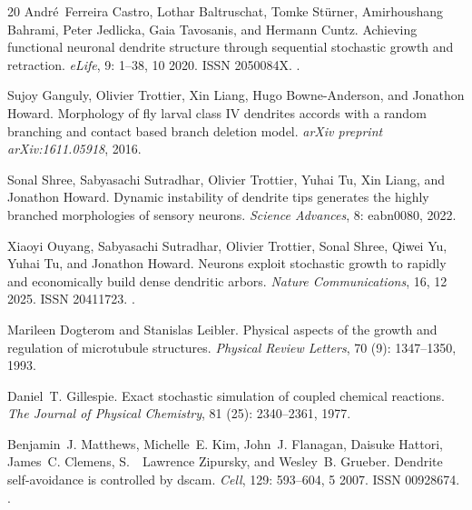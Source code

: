 \documentclass[11pt,a4paper]{article}
\begin{document}
\begin{thebibliography}{20}
André~Ferreira Castro, Lothar Baltruschat, Tomke Stürner, Amirhoushang
  Bahrami, Peter Jedlicka, Gaia Tavosanis, and Hermann Cuntz.
\newblock Achieving functional neuronal dendrite structure through sequential
  stochastic growth and retraction.
\newblock \emph{eLife}, 9: 1--38, 10 2020.
\newblock ISSN 2050084X.
\newblock {}.

Sujoy Ganguly, Olivier Trottier, Xin Liang, Hugo Bowne-Anderson, and Jonathon
  Howard.
\newblock Morphology of fly larval class {IV} dendrites accords with a random
  branching and contact based branch deletion model.
\newblock \emph{arXiv preprint arXiv:1611.05918}, 2016.

Sonal Shree, Sabyasachi Sutradhar, Olivier Trottier, Yuhai Tu, Xin Liang, and
  Jonathon Howard.
\newblock Dynamic instability of dendrite tips generates the highly branched
  morphologies of sensory neurons.
\newblock \emph{Science Advances}, 8: eabn0080, 2022.

Xiaoyi Ouyang, Sabyasachi Sutradhar, Olivier Trottier, Sonal Shree, Qiwei Yu,
  Yuhai Tu, and Jonathon Howard.
\newblock Neurons exploit stochastic growth to rapidly and economically build
  dense dendritic arbors.
\newblock \emph{Nature Communications}, 16, 12 2025.
\newblock ISSN 20411723.
\newblock {}.

Marileen Dogterom and Stanislas Leibler.
\newblock Physical aspects of the growth and regulation of microtubule
  structures.
\newblock \emph{Physical Review Letters}, 70 (9): 1347--1350,
  1993.

Daniel~T. Gillespie.
\newblock Exact stochastic simulation of coupled chemical reactions.
\newblock \emph{The Journal of Physical Chemistry}, 81 (25):
  2340--2361, 1977.

Benjamin~J. Matthews, Michelle~E. Kim, John~J. Flanagan, Daisuke Hattori,
  James~C. Clemens, S.~ Lawrence Zipursky, and Wesley~B. Grueber.
\newblock Dendrite self-avoidance is controlled by dscam.
\newblock \emph{Cell}, 129: 593--604, 5 2007.
\newblock ISSN 00928674.
\newblock {}.


\end{thebibliography}
\end{document}
